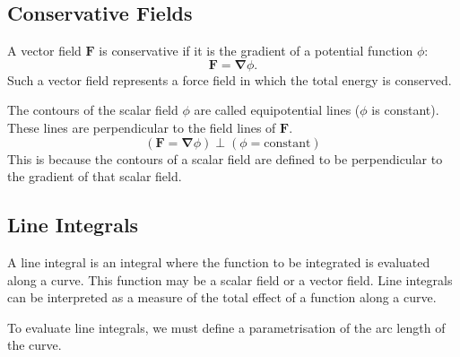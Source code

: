 \documentclass{article}
\begin{document}
\subsection{Conservative Fields}
A vector field \(\symbf{F}\) is conservative if it is the gradient of a
potential function \(\phi\):
\begin{equation*}
    \symbf{F} = \symbf{\nabla} \phi.
\end{equation*}
Such a vector field represents a force field in which the total energy is
conserved.

The contours of the scalar field \(\phi\) are called equipotential
lines (\(\phi\) is constant). These lines are perpendicular to the
field lines of \(\symbf{F}\).
\begin{equation*}
    \left( \symbf{F} = \symbf{\nabla} \phi \right) \perp \left( \phi = \text{constant} \right)
\end{equation*}
This is because the contours of a scalar field are defined to be
perpendicular to the gradient of that scalar field.
\subsection{Line Integrals}
A line integral is an integral where the function to be integrated is
evaluated along a curve. This function may be a scalar field or a
vector field. Line integrals can be interpreted as a measure of the
total effect of a function along a curve.

To evaluate line integrals, we must define a parametrisation of the arc
length of the curve.
\end{document}

